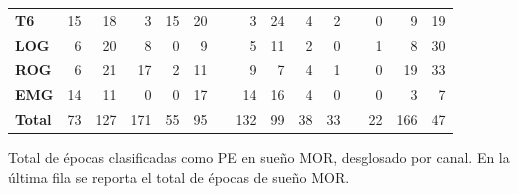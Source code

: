 \begin{SidewaysTable}
\begin{tabular}{lrrrrrcrrrrcrrr}
\rowcolor{gris}
\textbf{T6} &15&18&3 &15&20&&3 &24&4 &2 &&0 &9 &19 \\
\textbf{LOG}&6 &20&8 &0 &9 &&5 &11&2 &0 &&1 &8 &30 \\
\textbf{ROG}&6 &21&17&2 &11&&9 &7 &4 &1 &&0 &19&33 \\
\textbf{EMG}&14&11&0 &0 &17&&14&16&4 &0 &&0&3&7 \\
\rowcolor{gris2}
\textbf{Total}&73&127&171&55&95&&132&99&38&33&&22&166&47 \\
\bottomrule
\end{tabular}
\caption{Total de \'epocas clasificadas como PE en sue\~no MOR, desglosado por canal. En la 
\'ultima fila se reporta el total de \'epocas de sue\~no MOR.
}
\label{total_gpos_mor}
\end{SidewaysTable}


